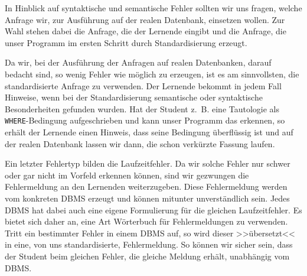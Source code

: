 In Hinblick auf syntaktische und semantische Fehler sollten wir uns fragen, welche Anfrage wir, zur Ausführung auf der realen Datenbank, einsetzen wollen. Zur Wahl stehen dabei die Anfrage, die der Lernende eingibt und die Anfrage, die unser Programm im ersten Schritt durch Standardisierung erzeugt. 

Da wir, bei der Ausführung der Anfragen auf realen Datenbanken, darauf bedacht sind, so wenig Fehler wie möglich zu erzeugen, ist es am sinnvollsten, die standardisierte Anfrage zu verwenden. Der Lernende bekommt in jedem Fall Hinweise, wenn bei der Standardisierung semantische oder syntaktische Besonderheiten gefunden wurden. Hat der Student \mbox{z. B.} eine Tautologie als \verb|WHERE|-Bedingung aufgeschrieben und kann unser Programm das erkennen, so erhält der Lernende einen Hinweis, dass seine Bedingung überflüssig ist und auf der realen Datenbank lassen wir dann, die schon verkürzte Fassung laufen. 

Ein letzter Fehlertyp bilden die Laufzeitfehler. Da wir solche Fehler nur schwer oder gar nicht im Vorfeld erkennen können, sind wir gezwungen die Fehlermeldung an den Lernenden weiterzugeben. Diese Fehlermeldung werden vom konkreten DBMS erzeugt und können mitunter unverständlich sein. Jedes DBMS hat dabei auch eine eigene Formulierung für die gleichen Laufzeitfehler. Es bietet sich daher an, eine Art Wörterbuch für Fehlermeldungen zu verwenden. Tritt ein bestimmter Fehler in einem DBMS auf, so wird dieser >>übersetzt<< in eine, von uns standardisierte, Fehlermeldung. So können wir sicher sein, dass der Student beim gleichen Fehler, die gleiche Meldung erhält, unabhängig vom DBMS.